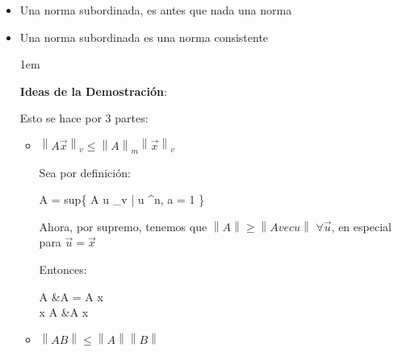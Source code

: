 \documentclass[12pt, fleqn]{report}                             %
\newenvironment{SmallIndentation}[1][0.75em]                    %
        {\begin{adjustwidth}{#1}{}\begin{footnotesize}}             %
        {\end{footnotesize}\end{adjustwidth}}                       %
\def \Eq {equation}                                             %
\newenvironment{MultiLineEquation*}[1]                          %
        {\begin{\Eq*}\begin{alignedat}{#1}}                         %
        {\end{alignedat}\end{\Eq*}}                                 %
\DeclareMathOperator \Space     {\quad}                         %
\DeclareMathOperator \MiniSpace {\;}                            %
\newcommand \Such           {\MiniSpace | \MiniSpace}           %
\theoremstyle{break}                                            %
\DeclareMathOperator \Reals        {\mathbb{R}}                 %
\newcommand{\Set}[1]            {\left\{ \; #1 \; \right\}}     %
\newcommand{\Abs}[1]    {\left\lVert #1 \right\lVert}           %
\begin{document}
                \begin{itemize}
                    
                    \item Una norma subordinada, es antes que nada una norma

                    \item
                        Una norma subordinada es una norma consistente

                        \begin{SmallIndentation}[1em]
                            \textbf{Ideas de la Demostración}:

                            Esto se hace por 3 partes:

                            \begin{itemize}
                                \item 
                                $\Abs{A \vec x}_v \leq \Abs{A}_m \Abs{\vec x}_v$

                                    Sea por definición:
                                    \begin{MultiLineEquation*}{3}
                                        \Abs{A} = sup\Set{
                                            \Abs{A \vec u}_v 
                                                \Such \vec u \in \Reals^n, \; \Abs{a} = 1
                                            }
                                    \end{MultiLineEquation*}

                                    Ahora, por supremo, tenemos que $\Abs{A} \geq \Abs{A vec u}$ 
                                    $\forall \vec u$, en especial para $\vec u = \vec x$

                                    Entonces:
                                    \begin{MultiLineEquation*}{3}
                                        \Abs{A} &\geq \Abs{A \dfrac{\vec x}{\Abs{x}}}       
                                                = \dfrac{1}{\Abs{x}} \Abs{A \vec x}        \\
                                                \Abs{\vec x}\Abs{A} &\geq \Abs{A \vec x}
                                    \end{MultiLineEquation*}

                                \item 
                                $\Abs{A B} \leq \Abs{A} \Abs{B}$


\end{itemize}
\end{SmallIndentation}
\end{itemize}
\end{document}

